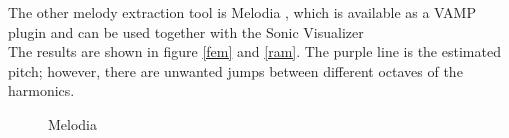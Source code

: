 \FloatBarrier
The other melody extraction tool is Melodia \cite{melodia1}, which is available as a VAMP plugin and can be used together with the Sonic Visualizer \cite{sonviz1}\\
The results are shown in figure \ref{fem} and \ref{ram}.
The purple line is the estimated pitch; however, there are unwanted jumps between different octaves of the harmonics. 

\begin{figure}[htbp]
	\centering
	\caption{Melodia}
	\label{fig:melodia}
\end{figure}
